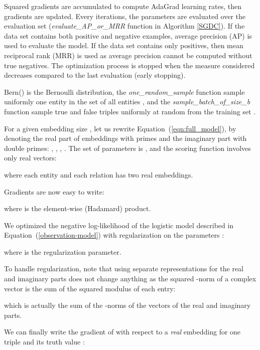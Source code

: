 \documentclass[twoside,11pt]{article}
\begin{document}
Squared gradients are accumulated to compute AdaGrad learning rates, then gradients are updated.
Every  iterations, the parameters  are evaluated over the evaluation set 
({\it evaluate\_AP\_or\_MRR} function 
in Algorithm \ref{SGDC}). If the data set contains both positive and negative examples,
average precision (AP) is used to evaluate the model. If the data set 
contains only positives, then mean reciprocal rank (MRR) is used as average precision
cannot be computed without true negatives. The optimization process is stopped when 
the measure considered decreases compared to the last evaluation (early stopping).

Bern() is the Bernoulli distribution, the {\it one\_random\_sample} function
sample uniformly one entity in the set of all entities ,
and the {\it sample\_batch\_of\_size\_b}
function sample  true and false triples uniformly at random
from the training set .

For a given embedding size , let us rewrite Equation~(\ref{eqn:full_model}), by denoting
the real part of embeddings with primes and the imaginary part with double primes: 
, , , .
The set of parameters is ,
and the scoring function involves only real vectors:

where each entity and each relation has two real embeddings. 


Gradients are now easy to write:

where  is the element-wise (Hadamard) product.


We optimized the negative log-likelihood of the logistic model described in Equation~(\ref{observation-model}) with  regularization on the parameters :

where  is the regularization parameter.






To handle regularization, note that using separate representations
for the real and imaginary parts does not change anything as
the squared -norm of a complex vector 
is the sum of the squared modulus of each entry:

which is actually the sum of the -norms of the vectors of the real and imaginary parts.


We can finally write the gradient of  with respect to a \emph{real} embedding  for
one triple  and its truth value :
\end{document}
